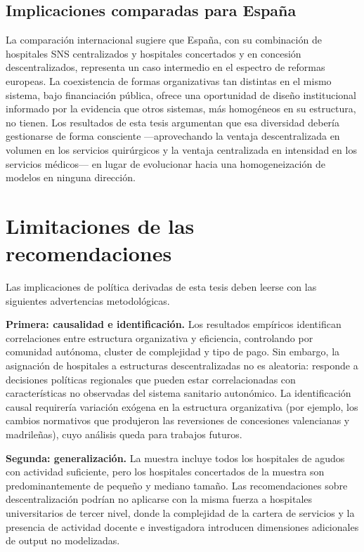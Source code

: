 \documentclass[12pt, a4paper, twoside, openright]{book}
\theoremstyle{plain}
\theoremstyle{definition}
\theoremstyle{remark}
\begin{document}
\subsection{Implicaciones comparadas para España}

La comparación internacional sugiere que España, con su combinación de hospitales SNS centralizados y hospitales concertados y en concesión descentralizados, representa un caso intermedio en el espectro de reformas europeas. La coexistencia de formas organizativas tan distintas en el mismo sistema, bajo financiación pública, ofrece una oportunidad de diseño institucional informado por la evidencia que otros sistemas, más homogéneos en su estructura, no tienen. Los resultados de esta tesis argumentan que esa diversidad debería gestionarse de forma consciente ---aprovechando la ventaja descentralizada en volumen en los servicios quirúrgicos y la ventaja centralizada en intensidad en los servicios médicos--- en lugar de evolucionar hacia una homogeneización de modelos en ninguna dirección.

\section{Limitaciones de las recomendaciones}
\label{sec:limitaciones_recomendaciones}

Las implicaciones de política derivadas de esta tesis deben leerse con las siguientes advertencias metodológicas.

\textbf{Primera: causalidad e identificación.} Los resultados empíricos identifican correlaciones entre estructura organizativa y eficiencia, controlando por comunidad autónoma, cluster de complejidad y tipo de pago. Sin embargo, la asignación de hospitales a estructuras descentralizadas no es aleatoria: responde a decisiones políticas regionales que pueden estar correlacionadas con características no observadas del sistema sanitario autonómico. La identificación causal requirería variación exógena en la estructura organizativa (por ejemplo, los cambios normativos que produjeron las reversiones de concesiones valencianas y madrileñas), cuyo análisis queda para trabajos futuros.

\textbf{Segunda: generalización.} La muestra incluye todos los hospitales de agudos con actividad suficiente, pero los hospitales concertados de la muestra son predominantemente de pequeño y mediano tamaño. Las recomendaciones sobre descentralización podrían no aplicarse con la misma fuerza a hospitales universitarios de tercer nivel, donde la complejidad de la cartera de servicios y la presencia de actividad docente e investigadora introducen dimensiones adicionales de output no modelizadas.
\end{document}
